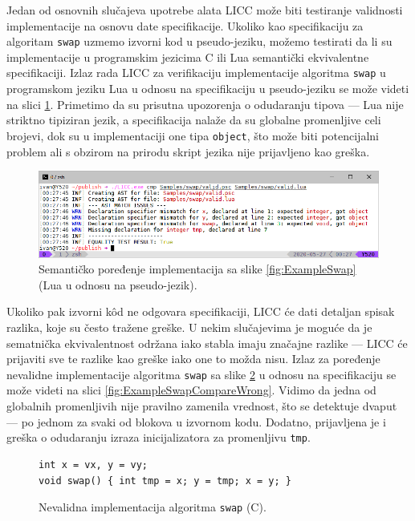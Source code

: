 Jedan od osnovnih slučajeva upotrebe alata LICC može biti testiranje validnosti implementacije na osnovu date specifikacije. Ukoliko kao specifikaciju za algoritam \texttt{swap} uzmemo izvorni kod u pseudo-jeziku, možemo testirati da li su implementacije u programskim jezicima C ili Lua semantički ekvivalentne specifikaciji. Izlaz rada LICC za verifikaciju implementacije algoritma \texttt{swap} u programskom jeziku Lua u odnosu na specifikaciju u pseudo-jeziku se može videti na slici \ref{fig:ExampleSwapCompareValid}. Primetimo da su prisutna upozorenja o odudaranju tipova --- Lua nije striktno tipiziran jezik, a specifikacija nalaže da su globalne promenljive celi brojevi, dok su u implementaciji one tipa \texttt{object}, što može biti potencijalni problem ali s obzirom na prirodu skript jezika nije prijavljeno kao greška.

\begin{figure}[h!]
\centering
\includegraphics[scale=0.65]{images/eval/cmp_valid.png}
\caption{Semantičko poređenje implementacija sa slike \ref{fig:ExampleSwap} (Lua u odnosu na pseudo-jezik).}
\label{fig:ExampleSwapCompareValid}
\end{figure}

Ukoliko pak izvorni k\^od ne odgovara specifikaciji, LICC će dati detaljan spisak razlika, koje su često tražene greške. U nekim slučajevima je moguće da je sematnička ekvivalentnost održana iako stabla imaju značajne razlike --- LICC će prijaviti sve te razlike kao greške iako one to možda nisu. Izlaz za poređenje nevalidne implementacije algoritma \texttt{swap} sa slike \ref{fig:ExampleSwapWrong} u odnosu na specifikaciju se može videti na slici \ref{fig:ExampleSwapCompareWrong}. Vidimo da jedna od globalnih promenljivih nije pravilno zamenila vrednost, što se detektuje dvaput --- po jednom za svaki od blokova u izvornom kodu. Dodatno, prijavljena je i greška o odudaranju izraza inicijalizatora za promenljivu \texttt{tmp}.

\begin{figure}[h!]
\begin{lstlisting}
int x = vx, y = vy;
void swap() { int tmp = x; y = tmp; x = y; }
\end{lstlisting}
\caption{Nevalidna implementacija algoritma \texttt{swap} (C).}
\label{fig:ExampleSwapWrong}
\end{figure}

